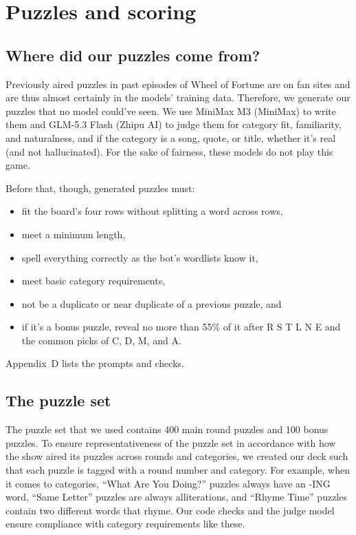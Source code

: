 \section{Puzzles and scoring}\label{sec:scoring}

\subsection{Where did our puzzles come from?}

Previously aired puzzles in past episodes of Wheel of Fortune are on fan sites and are thus almost certainly in the models' training data. Therefore, we generate our puzzles that no model could've seen. We use MiniMax M3 (MiniMax) to write them and GLM-5.3 Flash (Zhipu AI) to judge them for category fit, familiarity, and naturalness, and if the category is a song, quote, or title, whether it's real (and not hallucinated). For the sake of fairness, these models do not play this game. 

Before that, though, generated puzzles must:
\begin{itemize}
  \item fit the board's four rows without splitting a word across rows,
  \item meet a minimum length,
  \item spell everything correctly as the bot's wordlists know it,
  \item meet basic category requirements,
  \item not be a duplicate or near duplicate of a previous puzzle, and
  \item if it's a bonus puzzle, reveal no more than 55\% of it after R S T L N E and the common picks of C, D, M, and A. 
\end{itemize}

Appendix~D lists the prompts and checks.

\subsection{The puzzle set}

The puzzle set that we used contains 400 main round puzzles and 100 bonus puzzles. To ensure representativeness of the puzzle set in accordance with how the show aired its puzzles across rounds and categories, we created our deck such that each puzzle is tagged with a round number and category. For example, when it comes to categories, ``What Are You Doing?'' puzzles always have an -ING word, ``Same Letter'' puzzles are always alliterations, and ``Rhyme Time'' puzzles contain two different words that rhyme. Our code checks and the judge model ensure compliance with category requirements like these.

